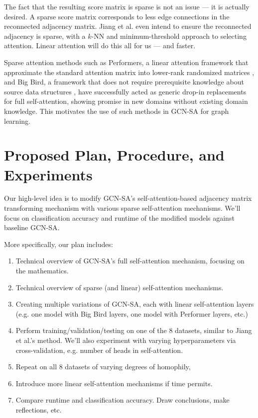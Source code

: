 \documentclass{article}
\begin{document}
The fact that the resulting score matrix is sparse is not an issue 
--- it is actually desired. 
A sparse score matrix corresponds to less edge connections
in the reconnected adjacency matrix.
Jiang et al. even intend to ensure the reconnected adjacency is sparse,
with a $ k $-NN and minimum-threshold approach to selecting attention.
Linear attention will do this all for us --- and faster.

Sparse attention methods such as Performers, a linear
attention framework that approximate the standard attention matrix
into lower-rank randomized matrices \cite{choromanski2020rethinking},
and Big Bird, a framework that does not require 
prerequisite knowledge about source data structures \cite{zaheer2020big},
have successfully acted as generic drop-in replacements
for full self-attention,
showing promise in new domains without
existing domain knowledge.
This motivates the use of such methods in GCN-SA
for graph learning.

\section{Proposed Plan, Procedure, and Experiments}

Our high-level idea is to 
modify GCN-SA's self-attention-based
adjacency matrix transforming mechanism
with various sparse self-attention mechanisms.
We'll focus on classification accuracy and 
runtime of the modified models
against baseline GCN-SA.

More specifically, our plan includes:
\begin{enumerate}
  \item Technical overview of GCN-SA's full self-attention mechanism,
    focusing on the mathematics.
  \item Technical overview of sparse (and linear) 
    self-attention mechanisms.
  \item Creating multiple variations of GCN-SA,
    each with linear self-attention layers 
    (e.g. one model with Big Bird layers, one model with Performer layers, etc.)
  \item Perform training/validation/testing on one of the 8 datasets,
    similar to Jiang et al.'s method.
    We'll also experiment with varying hyperparameters
    via cross-validation,
    e.g. number of heads in self-attention.
  \item Repeat on all 8 datasets of varying degrees of homophily,
  \item Introduce more linear self-attention mechanisms if time permits.
  \item Compare runtime and classification accuracy. 
    Draw conclusions, make reflections, etc.
\end{enumerate}
\end{document}

